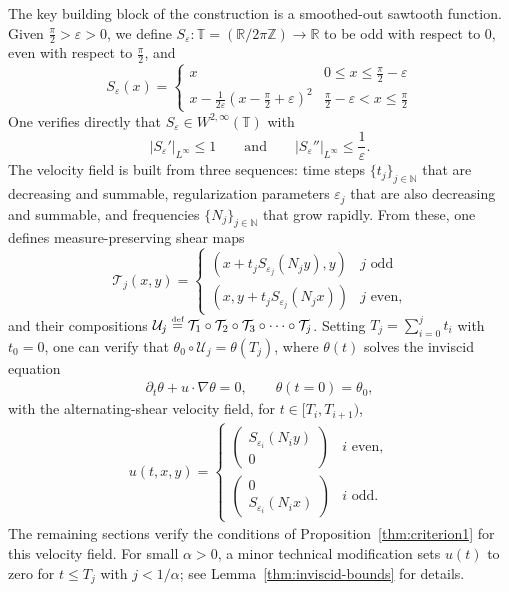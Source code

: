\documentclass[12pt]{report}   %
\newcommand{\defeq}{\stackrel{\scriptscriptstyle\textup{def}}{=}}
\renewcommand{\le}{\leqslant}
\renewcommand{\epsilon}{\varepsilon}
\numberwithin{equation}{section}
\theoremstyle{plain}
\theoremstyle{definition}
\theoremstyle{remark}
\newcommand{\eps}{{\varepsilon}}
\begin{document}
The key building block of the construction is a smoothed-out sawtooth function. Given $\frac{\pi}{2} > \epsilon>0$, we define $S_\epsilon:\mathbb{T} = (\mathbb{R}/2\pi\mathbb{Z})\rightarrow \mathbb{R}$ to be odd with respect to $0$, even with respect to {$\frac{\pi}{2}$}, and \[ S_\epsilon(x)=\begin{cases} 
      x & 0\le x\le {\frac{\pi}{2}} -\epsilon \\
      x -\frac{1}{2\epsilon}(x-\frac{\pi}{2}+\epsilon)^2  & \frac{\pi}{2}-\epsilon< x\le \frac{\pi}{2} 
   \end{cases}
\]
One verifies directly that $S_\epsilon\in W^{2,\infty}(\mathbb{T})$ with \[|S_\epsilon'|_{L^\infty}\le 1\qquad \text{and} \qquad |S_\epsilon''|_{L^\infty}\le \frac{1}{\epsilon}.\]
The velocity field is built from three sequences: time steps $\{t_j\}_{j\in\mathbb{N}}$ that are decreasing and summable, regularization parameters $\eps_j$ that are also decreasing and summable, and frequencies $\{N_j\}_{j\in\mathbb{N}}$ that grow rapidly. From these, one defines measure-preserving shear maps \[\mathcal{T}_j(x,y)=\begin{cases} (x+t_jS_{\eps_j}(N_j y),y) & j\,\, \text{odd}\\  (x,y+t_jS_{\eps_j}(N_j x)) & j\,\, \text{even,}\end{cases}\]
and their compositions $\mathcal{U}_j\defeq\mathcal{T}_1\circ \mathcal{T}_2\circ \mathcal{T}_3\circ \cdots \circ \mathcal{T}_j$. Setting $T_j = \sum_{i=0}^j t_i$ with $t_0 = 0$, one can verify that $\theta_0 \circ \mathcal{U}_j = \theta(T_j)$, where $\theta(t)$ solves the inviscid equation
\begin{equation*}
\begin{split}
\partial_t \theta + u\cdot\nabla \theta = 0, \qquad \theta(t=0) = \theta_0,
\end{split}
\end{equation*} with the alternating-shear velocity field, for $t \in [T_i,T_{i+1})$,
\begin{equation}\label{eq:velocity}
\begin{split}
u(t, x,y) = \begin{cases}
\begin{pmatrix}
S_{\eps_i}(N_iy) \\
0
\end{pmatrix}  & i \mbox{ even},  \\
\begin{pmatrix}
0 \\
S_{\eps_i}(N_ix)
\end{pmatrix} & i \mbox{ odd. }
\end{cases}
\end{split}
\end{equation}
The remaining sections verify the conditions of Proposition~\ref{thm:criterion1} for this velocity field. For small $\alpha > 0$, a minor technical modification sets $u(t)$ to zero for $t \le T_j$ with $j < 1/\alpha$; see Lemma~\ref{thm:inviscid-bounds} for details. 
\end{document}
